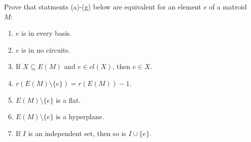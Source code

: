 \prob
{\label{t1:p9}
    Prove that statments (a)-(g) below are equivalent for an element $e$ of a matroid $M$:
    \begin{enumerate}[label=(\alph*)]
        \item $e$ is in every basis.
        \item $e$ is in no circuits.
        \item If $X \subseteq E(M)$ and $e \in cl(X)$, then $e \in X$.
        \item $r(E(M) \setminus \{e\}) = r(E(M)) - 1$.
        \item $E(M) \setminus \{e\}$ is a flat.
        \item $E(M) \setminus \{e\}$ is a hyperplane.
        \item If $I$ is an independent set, then so is $I \cup \{ e \}$.
    \end{enumerate}
}
